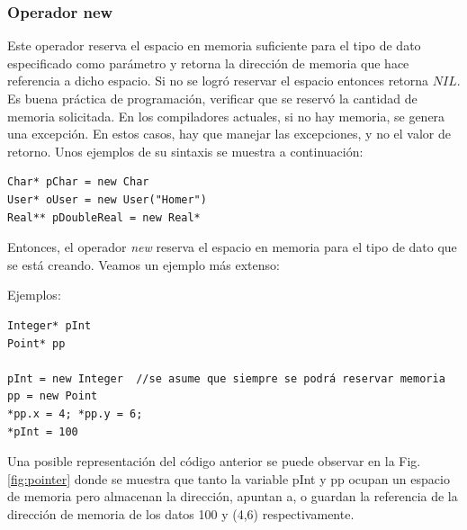 \subsubsection{Operador new}

Este operador reserva el espacio en memoria suficiente para el tipo de dato especificado como parámetro y retorna la dirección de memoria que hace referencia a dicho espacio. Si no se logró reservar el espacio entonces retorna $NIL$. Es buena práctica de programación, verificar que se reservó la cantidad de memoria solicitada. En los compiladores actuales, si no hay memoria, se genera una excepción. En estos casos, hay que manejar las excepciones, y no el valor de retorno. Unos ejemplos de su sintaxis se muestra a continuación:
\begin{lstlisting}[upquote=true, language=pseudo]
Char* pChar = new Char
User* oUser = new User("Homer")
Real** pDoubleReal = new Real*
\end{lstlisting}

Entonces, el operador \textit{new} reserva el espacio en memoria para el tipo de dato que se está creando. Veamos un ejemplo más extenso:

Ejemplos:
\begin{lstlisting}[upquote=true, language=pseudo]
Integer* pInt
Point* pp

pInt = new Integer	//se asume que siempre se podrá reservar memoria
pp = new Point
*pp.x = 4; *pp.y = 6;
*pInt = 100
\end{lstlisting}

Una posible representación del código anterior se puede observar en la Fig. \ref{fig:pointer} donde se muestra que tanto la variable pInt y pp ocupan un espacio de memoria pero almacenan la dirección, apuntan a, o guardan la referencia de la dirección de memoria de los datos 100 y (4,6) respectivamente.

